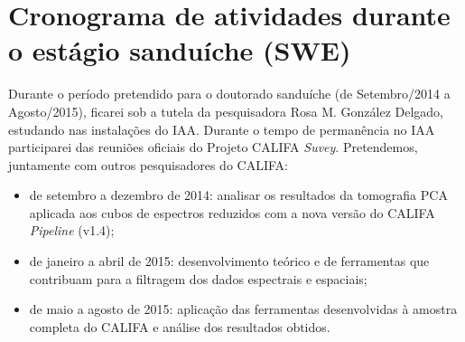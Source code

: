 \documentclass[a4paper,12pt]{article}
\begin{document}
\section{Cronograma de atividades durante o estágio sanduíche (SWE)}
\vspace{0.3cm}
Durante o período pretendido para o doutorado sanduíche (de Setembro/2014 a Agosto/2015), ficarei sob a tutela da pesquisadora Rosa M. González
Delgado, estudando nas instalações do IAA. Durante o tempo de permanência no IAA participarei das reuniões oficiais do Projeto CALIFA {\em Suvey}.
Pretendemos, juntamente com outros pesquisadores do CALIFA:
\begin{itemize}
  \item de setembro a dezembro de 2014: analisar os resultados da tomografia PCA aplicada aos cubos de espectros reduzidos com a nova versão do CALIFA
  {\em Pipeline} (v1.4);
  \item de janeiro a abril de 2015: desenvolvimento teórico e de ferramentas que contribuam para a filtragem dos dados espectrais e espaciais;
  \item de maio a agosto de 2015: aplicação das ferramentas desenvolvidas à amostra completa do CALIFA e análise dos resultados obtidos.
\end{itemize}



    
\end{document}
